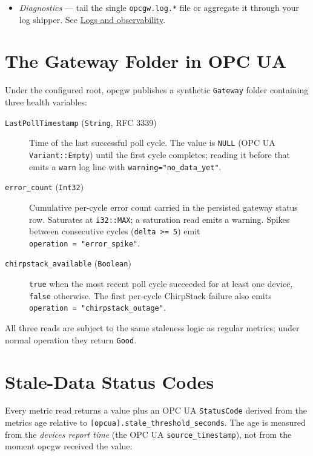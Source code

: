 \begin{itemize}
\item
  \emph{Diagnostics} --- tail the single \texttt{opcgw.log.*} file or aggregate it through your log shipper. See \hyperref[sec-logs-observability]{Logs and observability}.
\end{itemize}

\section{The Gateway Folder in OPC UA}\label{sec-gateway-folder}

Under the configured root, opcgw publishes a synthetic \texttt{Gateway} folder containing three health variables:

\begin{description}
\item[\texttt{LastPollTimestamp} (\texttt{String}, RFC 3339)]
Time of the last successful poll cycle. The value is \texttt{NULL} (OPC UA \texttt{Variant::Empty}) until the first cycle completes; reading it before that emits a \texttt{warn} log line with \texttt{warning="no\_data\_yet"}.
\item[\texttt{error\_count} (\texttt{Int32})]
Cumulative per-cycle error count carried in the persisted gateway status row. Saturates at \texttt{i32::MAX}; a saturation read emits a warning. Spikes between consecutive cycles (\texttt{delta\ \textgreater{}=\ 5}) emit \texttt{operation\ =\ "error\_spike"}.
\item[\texttt{chirpstack\_available} (\texttt{Boolean})]
\texttt{true} when the most recent poll cycle succeeded for at least one device, \texttt{false} otherwise. The first per-cycle ChirpStack failure also emits \texttt{operation\ =\ "chirpstack\_outage"}.
\end{description}

All three reads are subject to the same staleness logic as regular metrics; under normal operation they return \texttt{Good}.

\section{Stale-Data Status Codes}\label{sec-staleness-status-codes}

Every metric read returns a value plus an OPC UA \texttt{StatusCode} derived from the metric\textquotesingle s age relative to \texttt{{[}opcua{]}.stale\_threshold\_seconds}. The age is measured from the \emph{device\textquotesingle s report time} (the OPC UA \texttt{source\_timestamp}), not from the moment opcgw received the value:


